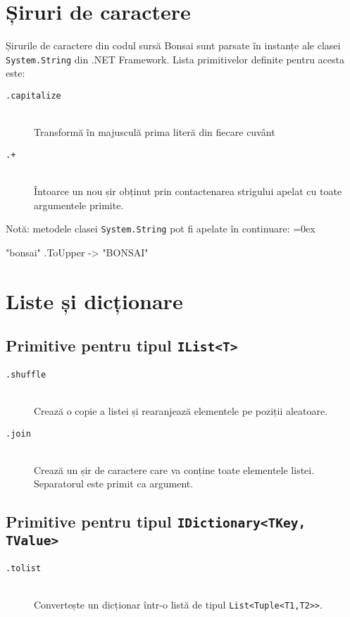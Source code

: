 \documentclass[12pt,a4paper]{memoir}
\renewcommand{\c}{\texttt}
\newenvironment{code}
{
\definecolor{shadecolor}{gray}{0.91}
\topsep=0ex
\relax
\shaded
\verbatim
}
{
\endverbatim
\endshaded
}
\begin{document}
\section{Șiruri de caractere}

Șirurile de caractere din codul sursă Bonsai sunt parsate în instanțe ale clasei \c{System.String} din .NET Framework. Lista primitivelor definite pentru acesta este:

\begin{description}
\item[\c{.capitalize}]\hfill\\Transformă în majusculă prima literă din fiecare cuvânt
\item[\c{.+}]\hfill\\Întoarce un nou șir obținut prin contactenarea strigului apelat cu toate argumentele primite.
\end{description}

Notă: metodele clasei \c{System.String} pot fi apelate în continuare:
\begin{code}
"bonsai" .ToUpper
  -> "BONSAI"
\end{code}

\section{Liste și dicționare}

\subsection{Primitive pentru tipul \c{IList<T>}}
\begin{description}
\item[\c{.shuffle}]\hfill\\Crează o copie a listei și rearanjează elementele pe poziții aleatoare.
\item[\c{.join}]\hfill\\Crează un șir de caractere care va conține toate elementele listei. Separatorul este primit ca argument.
\end{description}

\subsection{Primitive pentru tipul \c{IDictionary<TKey, TValue>}}
\begin{description}
\item[\c{.tolist}]\hfill\\Convertește un dicționar într-o listă de tipul \c{List<Tuple<T1,T2>>}.
\end{description}
\end{document}
